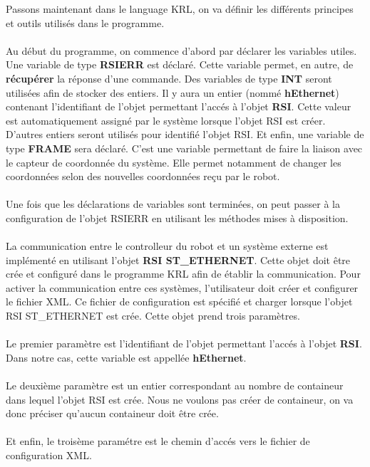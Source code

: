 Passons maintenant dans le language KRL, on va définir les différents principes et outils utilisés dans le programme.
\\
\\
Au début du programme, on commence d'abord par déclarer les variables utiles.
Une variable de type \textbf{RSIERR} est déclaré.
Cette variable permet, en autre, de \textbf{récupérer} la réponse d'une commande.
Des variables de type \textbf{INT} seront utilisées afin de stocker des entiers.
Il y aura un entier (nommé \textbf{hEthernet}) contenant l'identifiant de l'objet permettant l'accés à l'objet \textbf{RSI}.
Cette valeur est automatiquement assigné par le système lorsque l'objet RSI est créer.
D'autres entiers seront utilisés pour identifié l'objet RSI.
Et enfin, une variable de type \textbf{FRAME} sera déclaré.
C'est une variable permettant de faire la liaison avec le capteur de coordonnée du système.
Elle permet notamment de changer les coordonnées selon des nouvelles coordonnées reçu par le robot.
\\
\\
Une fois que les déclarations de variables sont terminées, on peut passer à la configuration de l'objet RSIERR en utilisant les méthodes mises à disposition.
\\
\\
La communication entre le controlleur du robot et un système externe est implémenté en utilisant l'objet \textbf{RSI ST\_ETHERNET}.
Cette objet doit être crée et configuré dans le programme KRL afin de établir la communication.
Pour activer la communication entre ces systèmes, l'utilisateur doit créer et configurer le fichier XML.
Ce fichier de configuration est spécifié et charger lorsque l'objet RSI ST\_ETHERNET est crée.
Cette objet prend trois paramètres.
\\
\\
Le premier paramètre est l'identifiant de l'objet permettant l'accés à l'objet \textbf{RSI}.
Dans notre cas, cette variable est appellée \textbf{hEthernet}.
\\
\\
Le deuxième paramètre est un entier correspondant au nombre de containeur dans lequel l'objet RSI est crée.
Nous ne voulons pas créer de containeur, on va donc préciser qu'aucun containeur doit être crée.
\\
\\
Et enfin, le troisème paramétre est le chemin d'accés vers le fichier de configuration XML. 
\\
\\
